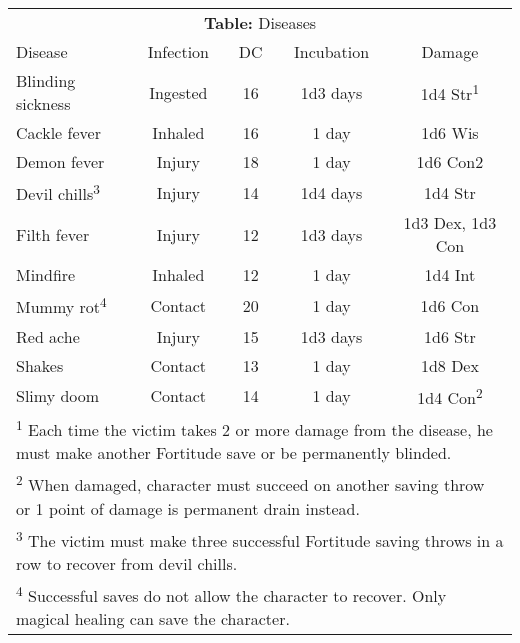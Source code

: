 \begin{table}
\begin{tabular}[h!]{l|cccc}
\multicolumn{5}{c}{\textbf{Table:} Diseases} \\
Disease                         & Infection & DC & Incubation & Damage                     \\ \hline
Blinding sickness               & Ingested  & 16 & 1d3 days   & 1d4 Str\textsuperscript{1} \\
Cackle fever                    & Inhaled   & 16 & 1 day      & 1d6 Wis                    \\
Demon fever                     & Injury    & 18 & 1 day      & 1d6 Con2                   \\
Devil chills\textsuperscript{3} & Injury    & 14 & 1d4 days   & 1d4 Str                    \\
Filth fever                     & Injury    & 12 & 1d3 days   & 1d3 Dex, 1d3 Con           \\
Mindfire                        & Inhaled   & 12 & 1 day      & 1d4 Int                    \\
Mummy rot\textsuperscript{4}    & Contact   & 20 & 1 day      & 1d6 Con                    \\
Red ache                        & Injury    & 15 & 1d3 days   & 1d6 Str                    \\
Shakes                          & Contact   & 13 & 1 day      & 1d8 Dex                    \\
Slimy doom                      & Contact   & 14 & 1 day      & 1d4 Con\textsuperscript{2} \\ \hline
\multicolumn{5}{p{7in}}{\textsuperscript{1} Each time the victim takes 2 or more damage from the disease, he must make another Fortitude save or be permanently blinded.} \\
\multicolumn{5}{p{7in}}{\textsuperscript{2} When damaged, character must succeed on another saving throw or 1 point of damage is permanent drain instead.} \\
\multicolumn{5}{p{7in}}{\textsuperscript{3} The victim must make three successful Fortitude saving throws in a row to recover from devil chills.} \\
\multicolumn{5}{p{7in}}{\textsuperscript{4} Successful saves do not allow the character to recover. Only magical healing can save the character.} \\
\end{tabular}
\end{table}


